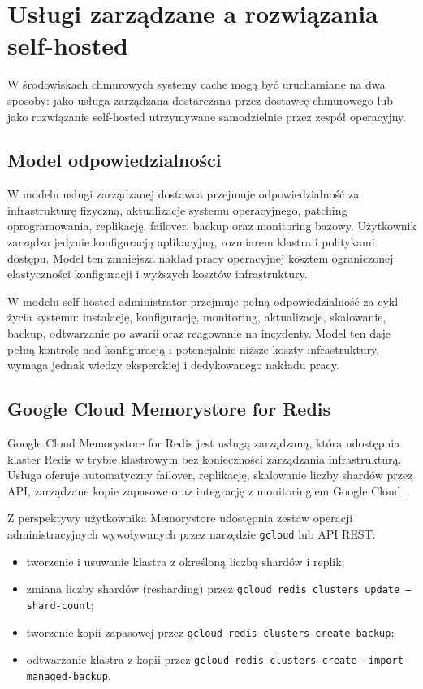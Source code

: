 \section{Usługi zarządzane a rozwiązania self-hosted}\label{sec:managed_vs_selfhosted}

W środowiskach chmurowych systemy cache mogą być uruchamiane na dwa sposoby: jako usługa zarządzana dostarczana przez dostawcę chmurowego lub jako rozwiązanie self-hosted utrzymywane samodzielnie przez zespół operacyjny.

\subsection{Model odpowiedzialności}

W modelu usługi zarządzanej dostawca przejmuje odpowiedzialność za infrastrukturę fizyczną, aktualizacje systemu operacyjnego, patching oprogramowania, replikację, failover, backup oraz monitoring bazowy. Użytkownik zarządza jedynie konfiguracją aplikacyjną, rozmiarem klastra i politykami dostępu. Model ten zmniejsza nakład pracy operacyjnej kosztem ograniczonej elastyczności konfiguracji i wyższych kosztów infrastruktury.

W modelu self-hosted administrator przejmuje pełną odpowiedzialność za cykl życia systemu: instalację, konfigurację, monitoring, aktualizacje, skalowanie, backup, odtwarzanie po awarii oraz reagowanie na incydenty. Model ten daje pełną kontrolę nad konfiguracją i potencjalnie niższe koszty infrastruktury, wymaga jednak wiedzy eksperckiej i dedykowanego nakładu pracy.

\subsection{Google Cloud Memorystore for Redis}

Google Cloud Memorystore for Redis jest usługą zarządzaną, która udostępnia klaster Redis w trybie klastrowym bez konieczności zarządzania infrastrukturą. Usługa oferuje automatyczny failover, replikację, skalowanie liczby shardów przez API, zarządzane kopie zapasowe oraz integrację z monitoringiem Google Cloud~\cite{gcpMemorystore}.

Z perspektywy użytkownika Memorystore udostępnia zestaw operacji administracyjnych wywoływanych przez narzędzie \texttt{gcloud} lub API REST:

\begin{itemize}
    \item tworzenie i usuwanie klastra z określoną liczbą shardów i replik;
    \item zmiana liczby shardów (resharding) przez \texttt{gcloud redis clusters update --shard-count};
    \item tworzenie kopii zapasowej przez \texttt{gcloud redis clusters create-backup};
    \item odtwarzanie klastra z kopii przez \texttt{gcloud redis clusters create --import-managed-backup}.
\end{itemize}


